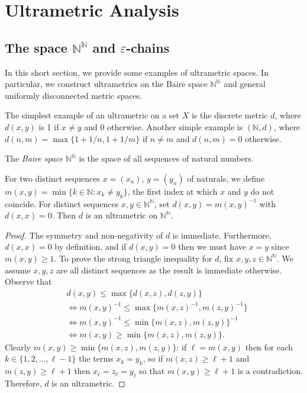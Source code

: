 \section{Ultrametric Analysis}
\subsection{The space \( \mathbb{N} ^{\mathbb{N} } \) and \( \varepsilon  \)-chains} In this short section, we provide some examples of ultrametric spaces. In particular, we construct ultrametrics on the Baire space $\mathbb{N} ^{\mathbb{N} } $ and general uniformly disconnected metric spaces.

The simplest example of an ultrametric on a set $X$ is the discrete metric $d$, where $d(x,y)$ is 1 if $x \neq y$ and 0 otherwise. Another simple example is $(\mathbb{N}, d)$, where \( d(n,m) = \max \{ 1 + 1/n , 1 + 1/m \}  \) if \( n \neq m \) and \( d(n, m) = 0 \) otherwise.

The \emph{Baire space} \( \mathbb{N} ^{\mathbb{N} }  \) is the space of all sequences of natural numbers.
\begin{example}
For two distinct sequences \( x =  (x_{n}) \), \( y = (y_{n} ) \) of naturals, we define \( m(x,y) = \min \{ k \in \mathbb{N} : x_{k} \neq y_{k}  \}  \), the first index at which \( x \) and \( y \) do not coincide. For distinct sequences \( x,y \in \mathbb{N} ^{\mathbb{N} }  \), set \( d(x,y) = m(x,y)^{-1}  \) with \( d(x,x) = 0 \). Then \( d \) is an ultrametric on \( \mathbb{N} ^{\mathbb{N} }  \).
\end{example}
\begin{proof}
The symmetry and non-negativity of \( d \) is immediate. Furthermore, \( d(x,x) = 0 \) by definition, and if \( d(x,y) = 0  \) then we must have \( x = y \) since \( m(x,y) \geq 1 \). To prove the strong triangle inequality for \( d \), fix \( x,y,z \in \mathbb{N} ^{\mathbb{N} }  \). We assume \( x,y,z \) are all distinct sequences as the result is immediate otherwise. Observe that
\begin{align*}
	&d(x,y) \leq \max \{ d(x,z), d(z,y) \} \\
	&\Leftrightarrow m(x,y)^{-1} \leq \max \{ m(x,z)^{-1} , m(z,y)^{-1}  \}  \\
	&\Leftrightarrow m(x,y)^{-1}  \leq \min \{ m(x,z), m(z,y) \} ^{-1} \\
	&\Leftrightarrow m(x,y) \geq \min \{ m(x,z), m(z,y) \}.
\end{align*}
Clearly \( m(x,y) \geq \min \{ m(x,z), m(z,y) \}  \): if \( \ell = m(x,y) \) then for each \( k \in \{ 1, 2, \hdots , \ell - 1 \} \) the terms \( x_{k} = y_{k}  \), so if \( m(x,z) \geq \ell + 1 \) and \( m(z,y) \geq \ell + 1 \) then \( x_{\ell} = z_{\ell} = y_{\ell}   \) so that \( m(x,y) \geq \ell + 1 \) is a contradiction. Therefore, \( d \) is an ultrametric.
\end{proof}

